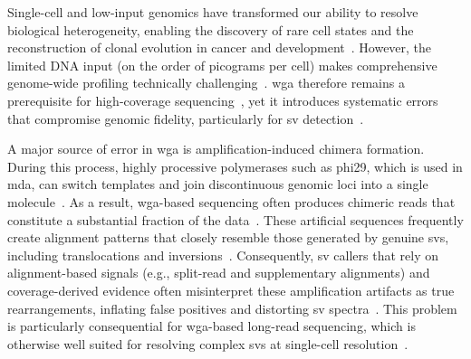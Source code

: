 \documentclass[pdflatex,lineno]{sn-jnl}%
\newif\ifrevisedtext
\newcommand{\chg}[1]{\ifrevisedtext\textcolor{revcolor}{#1}\else#1\fi}
\begin{document}
Single-cell and low-input genomics have transformed our ability to resolve biological heterogeneity, enabling the discovery of rare cell states and the reconstruction of clonal evolution in cancer and development~\cite{kalef2024single,navin2011tumour,sun2024mapping}.
However, the limited DNA input (on the order of picograms per cell) makes comprehensive genome-wide profiling technically challenging~\cite{gawad2016single,chen2017singlecell}.
\Gls{wga} therefore remains a prerequisite for high-coverage sequencing~\cite{macaulay2014single,de2014quantitative,biezuner2021comparison}, yet it introduces systematic errors that compromise genomic fidelity, particularly for \gls{sv} detection~\cite{lu2023chimera,lasken2007mechanism,agyabeng2025evaluating}.

A major source of error in \gls{wga} is amplification-induced chimera formation.
During this process, highly processive polymerases such as phi29, which is used in \gls{mda}, can switch templates and join discontinuous genomic loci into a single molecule~\cite{dean2002comprehensive,lu2023chimera,lu2023exploration,lasken2007mechanism,agyabeng2025evaluating}.
As a result, \gls{wga}-based sequencing often produces chimeric reads that constitute a substantial fraction of the data~\cite{lu2023chimera}.
These artificial sequences frequently create alignment patterns that closely resemble those generated by genuine \glspl{sv}, including translocations and inversions~\cite{lasken2007mechanism}.
Consequently, \gls{sv} callers that rely on alignment-based signals (e.g., split-read and supplementary alignments) and coverage-derived evidence often misinterpret these amplification artifacts as true rearrangements, inflating false positives and distorting \gls{sv} spectra~\cite{Sedlazeck2018,Smolka2024,chen2023deciphering,heller2019svim,jiang2020longreadbased,gonzalez-pena2021accurate,kosugi2019comprehensive,alkan2011genome, hardLongreadWholegenomeAnalysis2023a}.
This problem is particularly consequential for \gls{wga}-based long-read sequencing, which is otherwise well suited for resolving complex \glspl{sv} at \chg{single-cell} resolution~\cite{gupta2024Advances,wen2025Singlecell}.
\end{document}
